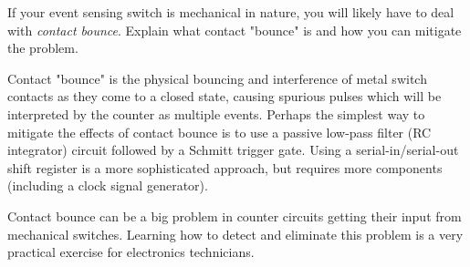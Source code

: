 

If your event sensing switch is mechanical in nature, you will likely have to deal with {\it contact bounce}.  Explain what contact "bounce" is and how you can mitigate the problem.







Contact "bounce" is the physical bouncing and interference of metal switch contacts as they come to a closed state, causing spurious pulses which will be interpreted by the counter as multiple events.  Perhaps the simplest way to mitigate the effects of contact bounce is to use a passive low-pass filter (RC integrator) circuit followed by a Schmitt trigger gate.  Using a serial-in/serial-out shift register is a more sophisticated approach, but requires more components (including a clock signal generator).







Contact bounce can be a big problem in counter circuits getting their input from mechanical switches.  Learning how to detect and eliminate this problem is a very practical exercise for electronics technicians.



